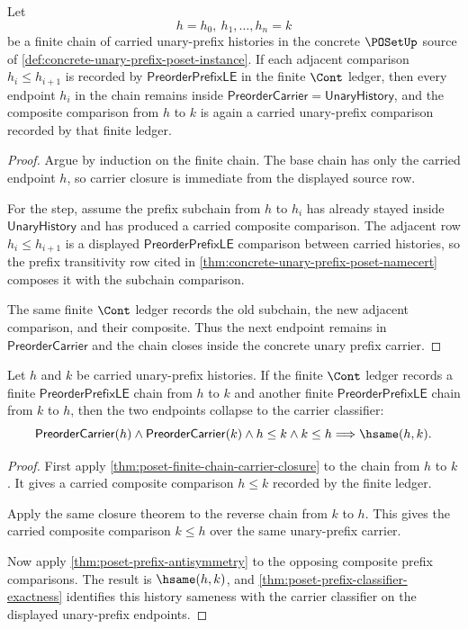 \begin{theorem}
\label{thm:poset-finite-chain-carrier-closure}
Let
$$
h=h_0,\ h_1,\ldots,h_n=k
$$
be a finite chain of carried unary-prefix histories in the concrete
$\POSetUp$ source of \autoref{def:concrete-unary-prefix-poset-instance}. If
each adjacent comparison $h_i\leq h_{i+1}$ is recorded by
$\mathsf{PreorderPrefixLE}$ in the finite $\Cont$ ledger, then every endpoint
$h_i$ in the chain remains inside
$\mathsf{PreorderCarrier}=\mathsf{UnaryHistory}$, and the composite comparison
from $h$ to $k$ is again a carried unary-prefix comparison recorded by that
finite ledger.
\end{theorem}
\begin{proof}
Argue by induction on the finite chain. The base chain has only the carried
endpoint $h$, so carrier closure is immediate from the displayed source row.

For the step, assume the prefix subchain from $h$ to $h_i$ has already stayed
inside $\mathsf{UnaryHistory}$ and has produced a carried composite comparison.
The adjacent row $h_i\leq h_{i+1}$ is a displayed
$\mathsf{PreorderPrefixLE}$ comparison between carried histories, so the
prefix transitivity row cited in
\autoref{thm:concrete-unary-prefix-poset-namecert} composes it with the
subchain comparison.

The same finite $\Cont$ ledger records the old subchain, the new adjacent
comparison, and their composite. Thus the next endpoint remains in
$\mathsf{PreorderCarrier}$ and the chain closes inside the concrete unary
prefix carrier.
\end{proof}

\begin{theorem}
\label{thm:poset-finite-chain-antisymmetry-collapse}
Let $h$ and $k$ be carried unary-prefix histories. If the finite $\Cont$ ledger
records a finite $\mathsf{PreorderPrefixLE}$ chain from $h$ to $k$ and another
finite $\mathsf{PreorderPrefixLE}$ chain from $k$ to $h$, then the two endpoints
collapse to the carrier classifier:
$$
\mathsf{PreorderCarrier}(h)\wedge\mathsf{PreorderCarrier}(k)
\wedge h\leq k\wedge k\leq h
\Longrightarrow \hsame(h,k).
$$
\end{theorem}
\begin{proof}
First apply \autoref{thm:poset-finite-chain-carrier-closure} to the chain from
$h$ to $k$. It gives a carried composite comparison $h\leq k$ recorded by the
finite ledger.

Apply the same closure theorem to the reverse chain from $k$ to $h$. This
gives the carried composite comparison $k\leq h$ over the same unary-prefix
carrier.

Now apply \autoref{thm:poset-prefix-antisymmetry} to the opposing composite
prefix comparisons. The result is $\hsame(h,k)$, and
\autoref{thm:poset-prefix-classifier-exactness} identifies this history
sameness with the carrier classifier on the displayed unary-prefix endpoints.
\end{proof}

